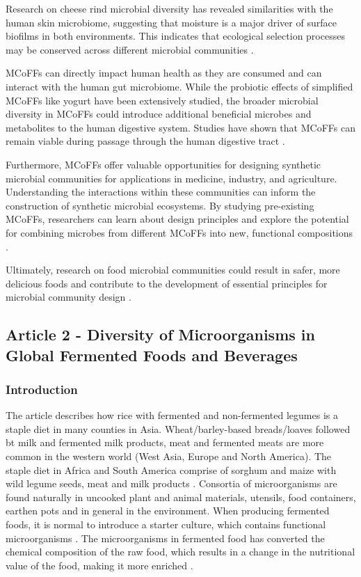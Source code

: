 Research on cheese rind microbial diversity has revealed similarities with the human skin microbiome, suggesting that moisture is a major driver of surface biofilms in both environments. This indicates that ecological selection processes may be conserved across different microbial communities \cite*{L1-FermentedFoods}.

MCoFFs can directly impact human health as they are consumed and can interact with the human gut microbiome. While the probiotic effects of simplified MCoFFs like yogurt have been extensively studied, the broader microbial diversity in MCoFFs could introduce additional beneficial microbes and metabolites to the human digestive system. Studies have shown that MCoFFs can remain viable during passage through the human digestive tract \cite*{L1-FermentedFoods}.

Furthermore, MCoFFs offer valuable opportunities for designing synthetic microbial communities for applications in medicine, industry, and agriculture. Understanding the interactions within these communities can inform the construction of synthetic microbial ecosystems. By studying pre-existing MCoFFs, researchers can learn about design principles and explore the potential for combining microbes from different MCoFFs into new, functional compositions \cite*{L1-FermentedFoods}. 

Ultimately, research on food microbial communities could result in safer, more delicious foods and contribute to the development of essential principles for microbial community design \cite*{L1-FermentedFoods}.


\subsection{Article 2 - Diversity of Microorganisms in Global Fermented Foods and Beverages}    

\subsubsection*{Introduction}
The article describes how rice with fermented and non-fermented legumes is a staple diet in many counties in Asia. Wheat/barley-based breads/loaves followed bt milk and fermented milk products, meat and fermented meats are more common in the western world (West Asia, Europe and North America). The staple diet in Africa and South America comprise of sorghum and maize with wild legume seeds, meat and milk products \cite*{L1-DiversityMicro}. 
Consortia of microorganisms are found naturally in uncooked plant and animal materials, utensils, food containers, earthen pots and in general in the environment. When producing fermented foods, it is normal to introduce a starter culture, which contains functional microorganisms \cite*{L1-DiversityMicro}. The microorganisms in fermented food has converted the chemical composition of the raw food, which results in a change in the nutritional value of the food, making it more enriched \cite*{L1-DiversityMicro}.


